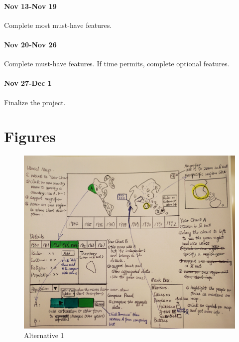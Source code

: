 \documentclass[12pt, fullpage,letterpaper]{article}
\begin{document}
\paragraph{Nov 13-Nov 19} Complete most must-have features.
\paragraph{Nov 20-Nov 26} Complete must-have features. If time permits, complete optional features.
\paragraph{Nov 27-Dec 1} Finalize the project.

\section{Figures}
\begin{figure}[h!]
    \begin{center}
        \includegraphics[width=\textwidth]{alternative1.JPG}
        \caption{Alternative 1}
        \label{fig:alt1}
    \end{center}
\end{figure}
\end{document}
